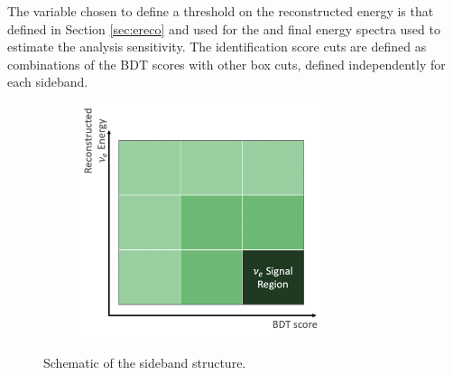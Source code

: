 The variable chosen to define a threshold on the reconstructed energy is that defined in Section \ref{sec:ereco} and used for the \npsel and \zpsel final energy spectra used to estimate the analysis sensitivity.
The identification score cuts are defined as combinations of the BDT scores with other box cuts, defined independently for each sideband.

\begin{figure}[H]
    \begin{center}
    \begin{subfigure}{0.5\textwidth}
    \includegraphics[width=0.8\textwidth]{Sidebands/Figures/SidebandDiagram.png}
    \end{subfigure}
    \caption{\label{fig:sidebandsintro} Schematic of the sideband structure.}
    \end{center}
\end{figure}
